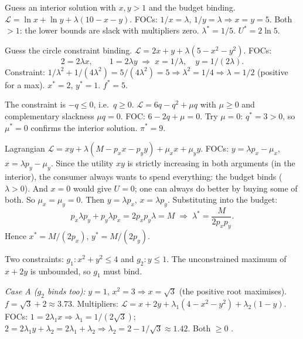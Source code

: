 \begin{solutions}
  \item Guess an interior solution with $x, y > 1$ and the budget binding.
        $\mathcal{L} = \ln x + \ln y + \lambda(10 - x - y)$. FOCs:
        $1/x = \lambda$, $1/y = \lambda \Rightarrow x = y = 5$. Both
        $> 1$: the lower bounds are slack with multipliers zero.
        $\lambda^* = 1/5$. $U^* = 2 \ln 5$.

  \item Guess the circle constraint binding.
        $\mathcal{L} = 2 x + y + \lambda(5 - x^2 - y^2)$. FOCs:
        \[
          2 = 2 \lambda x, \qquad 1 = 2 \lambda y
          \;\Rightarrow\; x = 1/\lambda, \quad y = 1/(2 \lambda) .
        \]
        Constraint: $1/\lambda^2 + 1/(4 \lambda^2) = 5/(4 \lambda^2) = 5
        \Rightarrow \lambda^2 = 1/4 \Rightarrow \lambda = 1/2$ (positive
        for a max). $x^* = 2$, $y^* = 1$. $f^* = 5$.

  \item The constraint is $-q \leq 0$, i.e.\ $q \geq 0$.
        $\mathcal{L} = 6 q - q^2 + \mu q$ with $\mu \geq 0$ and
        complementary slackness $\mu q = 0$. FOC: $6 - 2 q + \mu = 0$. Try
        $\mu = 0$: $q^* = 3 > 0$, so $\mu^* = 0$ confirms the interior
        solution. $\pi^* = 9$.

  \item Lagrangian
        $\mathcal{L} = x y + \lambda(M - p_x x - p_y y)
        + \mu_x x + \mu_y y$. FOCs: $y = \lambda p_x - \mu_x$,
        $x = \lambda p_y - \mu_y$. Since the utility $x y$ is strictly
        increasing in both arguments (in the interior), the consumer always
        wants to spend everything: the budget binds ($\lambda > 0$). And
        $x = 0$ would give $U = 0$; one can always do better by buying some
        of both. So $\mu_x = \mu_y = 0$. Then $y = \lambda p_x$,
        $x = \lambda p_y$. Substituting into the budget:
        \[
          p_x \lambda p_y + p_y \lambda p_x = 2 p_x p_y \lambda = M
          \;\Rightarrow\; \lambda^* = \frac{M}{2 p_x p_y} .
        \]
        Hence $x^* = M/(2 p_x)$, $y^* = M/(2 p_y)$.

  \item Two constraints: $g_1\colon x^2 + y^2 \leq 4$ and
        $g_2\colon y \leq 1$. The unconstrained maximum of $x + 2 y$ is
        unbounded, so $g_1$ must bind.

        \emph{Case A ($g_2$ binds too):} $y = 1$,
        $x^2 = 3 \Rightarrow x = \sqrt{3}$ (the positive root maximises).
        $f = \sqrt{3} + 2 \approx 3.73$. Multipliers:
        $\mathcal{L} = x + 2 y + \lambda_1(4 - x^2 - y^2)
        + \lambda_2(1 - y)$. FOCs: $1 = 2 \lambda_1 x \Rightarrow
        \lambda_1 = 1/(2 \sqrt{3})$;
        $2 = 2 \lambda_1 y + \lambda_2 = 2 \lambda_1 + \lambda_2
        \Rightarrow \lambda_2 = 2 - 1/\sqrt{3} \approx 1.42$. Both
        $\geq 0$ \checkmark.


\end{solutions}
